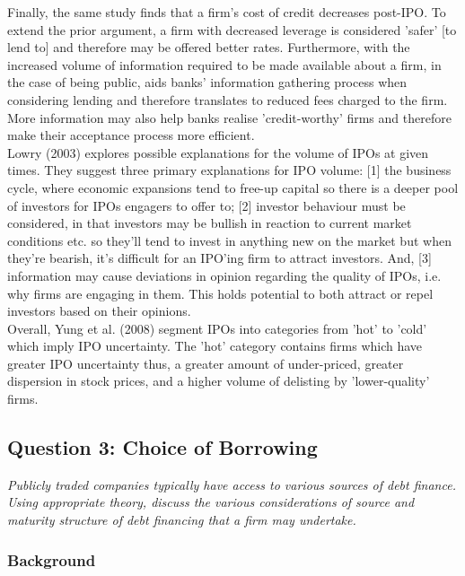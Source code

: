 \documentclass[11pt, english]{article}
\begin{document}
	Finally, the same study finds that a firm's cost of credit decreases post-IPO. To extend the prior argument, a firm with decreased leverage is considered 'safer' [to lend to] and therefore may be offered better rates. Furthermore, with the increased volume of information required to be made available about a firm, in the case of being public, aids banks' information gathering process when considering lending and therefore translates to reduced fees charged to the firm. More information may also help banks realise 'credit-worthy' firms and therefore make their acceptance process more efficient.\\

	Lowry (2003) explores possible explanations for the volume of IPOs at given times. They suggest three primary explanations for IPO volume: [1] the business cycle, where economic expansions tend to free-up capital so there is a deeper pool of investors for IPOs engagers to offer to; [2] investor behaviour must be considered, in that investors may be bullish in reaction to current market conditions etc. so they'll tend to invest in anything new on the market but when they're bearish, it's difficult for an IPO'ing firm to attract investors. And, [3] information may cause deviations in opinion regarding the quality of IPOs, i.e. why firms are engaging in them. This holds potential to both attract or repel investors based on their opinions.\\

	Overall, Yung et al. (2008) segment IPOs into categories from 'hot' to 'cold' which imply IPO uncertainty. The 'hot' category contains firms which have greater IPO uncertainty thus, a greater amount of under-priced, greater dispersion in stock prices, and a higher volume of delisting by 'lower-quality' firms.

	\newpage

	\subsection{Question 3: Choice of Borrowing}

	\textit{Publicly traded companies typically have access to various sources of debt finance. Using appropriate theory, discuss the various considerations of source and maturity structure of debt financing that a firm may undertake.}

		\subsubsection*{Background}
\end{document}
